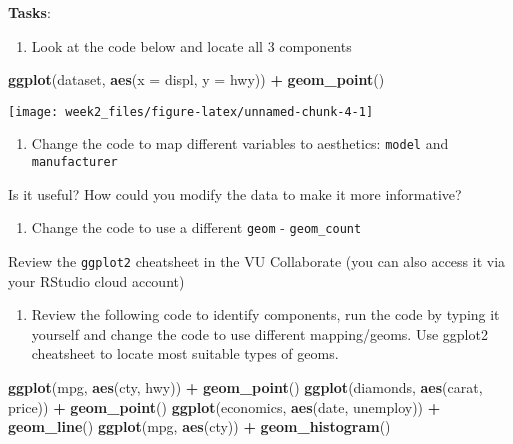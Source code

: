 \documentclass[
]{article}
\newenvironment{Shaded}{\begin{snugshade}}{\end{snugshade}}
\newcommand{\DataTypeTok}[1]{\textcolor[rgb]{0.13,0.29,0.53}{#1}}
\newcommand{\KeywordTok}[1]{\textcolor[rgb]{0.13,0.29,0.53}{\textbf{#1}}}
\newcommand{\NormalTok}[1]{#1}
\newcommand{\OperatorTok}[1]{\textcolor[rgb]{0.81,0.36,0.00}{\textbf{#1}}}
\newcommand{\StringTok}[1]{\textcolor[rgb]{0.31,0.60,0.02}{#1}}
\providecommand{\tightlist}{%
  \setlength{\itemsep}{0pt}\setlength{\parskip}{0pt}}
\begin{document}
\textbf{Tasks}:

\begin{enumerate}
\def\labelenumi{\arabic{enumi}.}
\tightlist
\item
  Look at the code below and locate all 3 components
\end{enumerate}

\begin{Shaded}
\begin{Highlighting}[]
\KeywordTok{ggplot}\NormalTok{(dataset, }\KeywordTok{aes}\NormalTok{(}\DataTypeTok{x =}\NormalTok{ displ, }\DataTypeTok{y =}\NormalTok{ hwy)) }\OperatorTok{+}\StringTok{ }
\StringTok{  }\KeywordTok{geom_point}\NormalTok{()}
\end{Highlighting}
\end{Shaded}

\begin{center}\texttt{[image: week2\_files/figure-latex/unnamed-chunk-4-1]} \end{center}

\begin{enumerate}
\def\labelenumi{\arabic{enumi}.}
\setcounter{enumi}{1}
\tightlist
\item
  Change the code to map different variables to aesthetics:
  \texttt{model} and \texttt{manufacturer}
\end{enumerate}

Is it useful? How could you modify the data to make it more informative?

\begin{enumerate}
\def\labelenumi{\arabic{enumi}.}
\setcounter{enumi}{2}
\tightlist
\item
  Change the code to use a different \texttt{geom} -
  \texttt{geom\_count}
\end{enumerate}

Review the \texttt{ggplot2} cheatsheet in the VU Collaborate (you can
also access it via your RStudio cloud account)

\begin{enumerate}
\def\labelenumi{\arabic{enumi}.}
\setcounter{enumi}{3}
\tightlist
\item
  Review the following code to identify components, run the code by
  typing it yourself and change the code to use different mapping/geoms.
  Use ggplot2 cheatsheet to locate most suitable types of geoms.
\end{enumerate}

\begin{Shaded}
\begin{Highlighting}[]
\KeywordTok{ggplot}\NormalTok{(mpg, }\KeywordTok{aes}\NormalTok{(cty, hwy)) }\OperatorTok{+}\StringTok{ }\KeywordTok{geom_point}\NormalTok{()}
\KeywordTok{ggplot}\NormalTok{(diamonds, }\KeywordTok{aes}\NormalTok{(carat, price)) }\OperatorTok{+}\StringTok{ }\KeywordTok{geom_point}\NormalTok{()}
\KeywordTok{ggplot}\NormalTok{(economics, }\KeywordTok{aes}\NormalTok{(date, unemploy)) }\OperatorTok{+}\StringTok{ }\KeywordTok{geom_line}\NormalTok{()}
\KeywordTok{ggplot}\NormalTok{(mpg, }\KeywordTok{aes}\NormalTok{(cty)) }\OperatorTok{+}\StringTok{ }\KeywordTok{geom_histogram}\NormalTok{()}
\end{Highlighting}
\end{Shaded}
\end{document}
